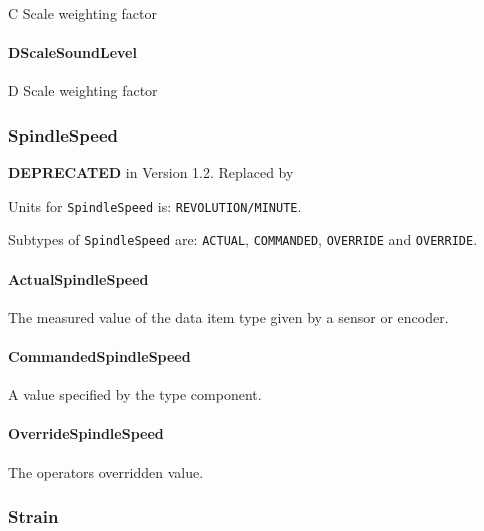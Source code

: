 C Scale weighting factor


\paragraph{DScaleSoundLevel}\mbox{}
\label{sec:DScaleSoundLevel}



D Scale weighting factor


\subsubsection{SpindleSpeed}
\label{sec:SpindleSpeed}



\textbf{DEPRECATED} in Version 1.2.  Replaced by 


Units for \texttt{SpindleSpeed} is: \texttt{REVOLUTION/MINUTE}.


Subtypes of \texttt{SpindleSpeed} are: \texttt{ACTUAL}, \texttt{COMMANDED}, \texttt{OVERRIDE} and \texttt{OVERRIDE}. 
\FloatBarrier

\paragraph{ActualSpindleSpeed}\mbox{}
\label{sec:ActualSpindleSpeed}



The measured value of the data item type given by a sensor or encoder.


\paragraph{CommandedSpindleSpeed}\mbox{}
\label{sec:CommandedSpindleSpeed}



A value specified by the  type component.


\paragraph{OverrideSpindleSpeed}\mbox{}
\label{sec:OverrideSpindleSpeed}



The operators overridden value.


\subsubsection{Strain}
\label{sec:Strain}



